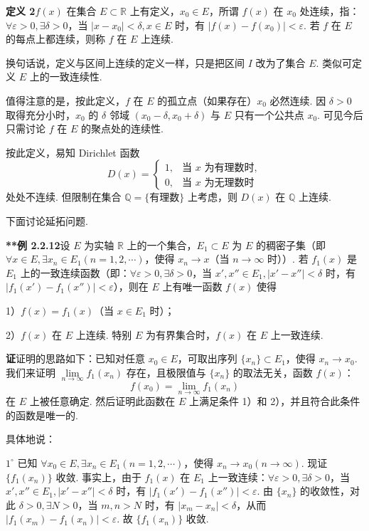 \documentclass[UTF8, 12pt, fontset=fandol, oneside]{ctexart}
\begin{document}
\noindent\textbf{定义 2}\quad $f(x)$ 在集合 $E\subset\mathbb{R}$ 上有定义，$x_0\in E$，所谓 $f(x)$ 在 $x_0$ 处连续，指：$\forall\varepsilon>0,\exists\delta>0$，当 $|x-x_0|<\delta,x\in E$ 时，有 $|f(x)-f(x_0)|<\varepsilon$. 若 $f$ 在 $E$ 的每点上都连续，则称 $f$ 在 $E$ 上连续.

换句话说，定义与区间上连续的定义一样，只是把区间 $I$ 改为了集合 $E$. 类似可定义 $E$ 上的一致连续性.

值得注意的是，按此定义，$f$ 在 $E$ 的孤立点（如果存在）$x_0$ 必然连续. 因 $\delta>0$ 取得充分小时，$x_0$ 的 $\delta$ 邻域 $(x_0-\delta,x_0+\delta)$ 与 $E$ 只有一个公共点 $x_0$. 可见今后只需讨论 $f$ 在 $E$ 的聚点处的连续性.

按此定义，易知 Dirichlet 函数
\[
  D(x)=
  \begin{cases}
    1, & \text{当 }x\text{ 为有理数时},\\
    0, & \text{当 }x\text{ 为无理数时}
  \end{cases}
\]
处处不连续. 但限制在集合 $\mathbb{Q}=\{\text{有理数}\}$ 上考虑，则 $D(x)$ 在 $\mathbb{Q}$ 上连续.

下面讨论延拓问题.

\noindent\textbf{**例 2.2.12}\quad 设 $E$ 为实轴 $\mathbb{R}$ 上的一个集合，$E_1\subset E$ 为 $E$ 的稠密子集（即 $\forall x\in E,\exists x_n\in E_1(n=1,2,\cdots)$，使得 $x_n\to x$（当 $n\to\infty$ 时））. 若 $f_1(x)$ 是 $E_1$ 上的一致连续函数（即：$\forall\varepsilon>0,\exists\delta>0$，当 $x',x''\in E_1,|x'-x''|<\delta$ 时，有 $|f_1(x')-f_1(x'')|<\varepsilon$），则在 $E$ 上有唯一函数 $f(x)$ 使得

1）$f(x)=f_1(x)$（当 $x\in E_1$ 时）；

2）$f(x)$ 在 $E$ 上连续. 特别 $E$ 为有界集合时，$f(x)$ 在 $E$ 上一致连续.

\noindent\textbf{证}\quad 证明的思路如下：已知对任意 $x_0\in E$，可取出序列 $\{x_n\}\subset E_1$，使得 $x_n\to x_0$. 我们来证明 $\lim\limits_{n\to\infty}f_1(x_n)$ 存在，且极限值与 $\{x_n\}$ 的取法无关，函数 $f(x)$：
\[
  f(x_0)=\lim_{n\to\infty}f_1(x_n)
\]
在 $E$ 上被任意确定. 然后证明此函数在 $E$ 上满足条件 1）和 2），并且符合此条件的函数是唯一的.

具体地说：

$1^\circ$ 已知 $\forall x_0\in E,\exists x_n\in E_1(n=1,2,\cdots)$，使得 $x_n\to x_0(n\to\infty)$. 现证 $\{f_1(x_n)\}$ 收敛. 事实上，由于 $f_1(x)$ 在 $E_1$ 上一致连续：$\forall\varepsilon>0,\exists\delta>0$，当 $x',x''\in E_1,|x'-x''|<\delta$ 时，有 $|f_1(x')-f_1(x'')|<\varepsilon$. 由 $\{x_n\}$ 的收敛性，对此 $\delta>0,\exists N>0$，当 $m,n>N$ 时，有 $|x_m-x_n|<\delta$，从而 $|f_1(x_m)-f_1(x_n)|<\varepsilon$. 故 $\{f_1(x_n)\}$ 收敛.
\end{document}
